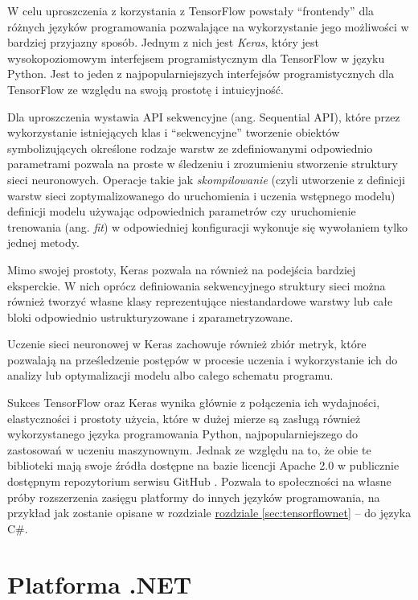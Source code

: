 W celu uproszczenia z korzystania z TensorFlow powstały ``frontendy'' dla różnych języków programowania pozwalające na wykorzystanie jego możliwości w bardziej przyjazny sposób.
Jednym z nich jest \emph{Keras}, który jest wysokopoziomowym interfejsem programistycznym dla TensorFlow w języku Python.
Jest to jeden z najpopularniejszych interfejsów programistycznych dla TensorFlow ze względu na swoją prostotę i intuicyjność.

Dla uproszczenia wystawia API sekwencyjne (ang. Sequential API), które przez wykorzystanie istniejących klas i ``sekwencyjne'' tworzenie obiektów symbolizujących określone rodzaje warstw ze zdefiniowanymi odpowiednio parametrami pozwala na proste w śledzeniu i zrozumieniu stworzenie struktury sieci neuronowych.
Operacje takie jak \emph{skompilowanie} (czyli utworzenie z definicji warstw sieci zoptymalizowanego do uruchomienia i uczenia wstępnego modelu) definicji modelu używając odpowiednich parametrów czy uruchomienie trenowania (ang. \emph{fit}) w odpowiedniej konfiguracji wykonuje się wywołaniem tylko  jednej metody.

Mimo swojej prostoty, Keras pozwala na również na podejścia bardziej eksperckie.
W nich oprócz definiowania sekwencyjnego struktury sieci można również tworzyć własne klasy reprezentujące niestandardowe warstwy lub całe bloki odpowiednio ustrukturyzowane i zparametryzowane.

Uczenie sieci neuronowej w Keras zachowuje również zbiór metryk, które pozwalają na prześledzenie postępów w procesie uczenia i wykorzystanie ich do analizy lub optymalizacji modelu albo całego schematu programu.

Sukces TensorFlow oraz Keras wynika głównie z połączenia ich wydajności, elastyczności i prostoty użycia, które w dużej mierze są zasługą również wykorzystanego języka programowania Python, najpopularniejszego do zastosowań w uczeniu maszynownym.
Jednak ze względu na to, że obie te biblioteki mają swoje źródła dostępne na bazie licencji Apache 2.0 w publicznie dostępnym repozytorium serwisu GitHub \cite{tensorflow}.
Pozwala to społeczności na własne próby rozszerzenia zasięgu platformy do innych języków programowania, na przykład jak zostanie opisane w rozdziale \hyperref[sec:tensorflownet]{rozdziale \ref*{sec:tensorflownet}} -- do języka C\#.

\section{Platforma .NET}

